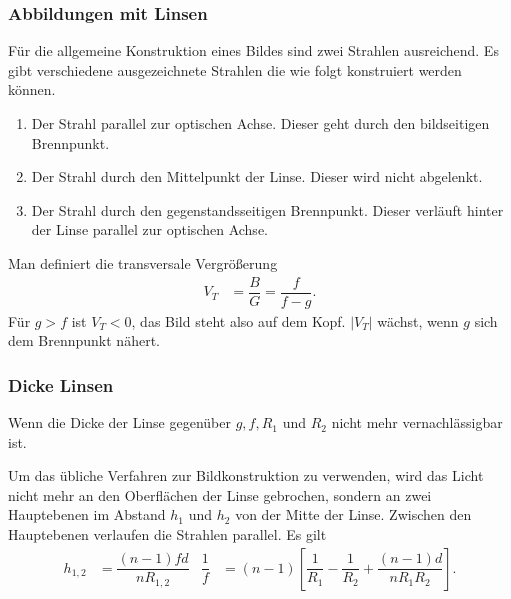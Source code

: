 \documentclass[a4paper,12pt]{article}
\numberwithin{equation}{section}
\begin{document}
\subsubsection{Abbildungen mit Linsen}
Für die allgemeine Konstruktion eines Bildes sind zwei Strahlen ausreichend. Es gibt verschiedene ausgezeichnete Strahlen die wie folgt konstruiert werden können.
\begin{enumerate}[label=\roman*)]
        \item Der Strahl parallel zur optischen Achse. Dieser geht durch den bildseitigen Brennpunkt.
        \item Der Strahl durch den Mittelpunkt der Linse. Dieser wird nicht abgelenkt.
        \item Der Strahl durch den gegenstandsseitigen Brennpunkt. Dieser verläuft hinter der Linse parallel zur optischen Achse.
\end{enumerate}
Man definiert die transversale Vergrößerung
\begin{align} 
        V_T&=\dfrac{B}{G}=\dfrac{f}{f-g}
.\end{align} 
Für $g>f$ ist $V_T<0$, das Bild steht also auf dem Kopf. $|V_T|$ wächst, wenn $g$ sich dem Brennpunkt nähert.

\subsubsection{Dicke Linsen}
Wenn die Dicke der Linse gegenüber $g,f,R_1$ und $R_2$ nicht mehr vernachlässigbar ist.\par
Um das übliche Verfahren zur Bildkonstruktion zu verwenden, wird das Licht nicht mehr an den Oberflächen der Linse gebrochen, sondern an zwei Hauptebenen im Abstand $h_1$ und $h_2$ von der Mitte der Linse.
Zwischen den Hauptebenen verlaufen die Strahlen parallel.
Es gilt
\begin{align} 
        h_{1,2}&=\dfrac{\left(n-1\right)fd}{nR_{1,2}}&\dfrac{1}{f}&=\left(n-1\right)\left[\dfrac{1}{R_1}-\dfrac{1}{R_2}+\dfrac{\left(n-1\right)d}{nR_1R_2}\right]
.\end{align} 

\newpage
\end{document}
